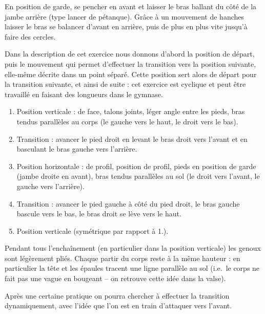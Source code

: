 \begin{exercice}
En position de garde, se pencher en avant et laisser le bras ballant du côté de la jambe arrière (type lancer de pétanque).
Grâce à un mouvement de hanches laisser le bras se balancer d'avant en arrière, puis de plus en plus vite jusqu'à faire des cercles.

\end{exercice}


\begin{exercice}
\label{struc:ex:roue-avant}


Dans la description de cet exercice nous donnons d'abord la position de départ, puis le mouvement qui permet d'effectuer la transition vers la position suivante, elle-même décrite dans un point séparé.
Cette position sert alors de départ pour la transition suivante, et ainsi de suite : cet exercice est cyclique et peut être travaillé en faisant des longueurs dans le gymnase.

\begin{enumerate}
	\item Position verticale : de face, talons joints, léger angle entre les pieds, bras tendus parallèles au corps (le gauche vers le haut, le droit vers le bas).
	
	\item Transition : avancer le pied droit en levant le bras droit vers l'avant et en basculant le bras gauche vers l'arrière.
	
	\item Position horizontale : de profil, position de profil, pieds en position de garde (jambe droite en avant), bras tendus parallèles au sol (le droit vers l'avant, le gauche vers l'arrière).
	
	\item Transition : avancer le pied gauche à côté du pied droit, le bras gauche bascule vers le bas, le bras droit se lève vers le haut.
	
	\item Position verticale (symétrique par rapport à 1.).
\end{enumerate}

Pendant tous l'enchaînement (en particulier dans la position verticale) les genoux sont légèrement pliés.
Chaque partir du corps reste à la même hauteur : en particulier la tête et les épaules tracent une ligne parallèle au sol (i.e.\ le corps ne fait pas une vague en bougeant -- on retrouve cette idée dans la valse).

Après une certaine pratique on pourra chercher à effectuer la transition dynamiquement, avec l'idée que l'on est en train d'attaquer vers l'avant.

\end{exercice}


